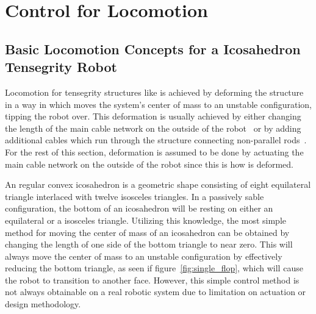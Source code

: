 \chapter{Control for \SB{} Locomotion}
\label{controls}

\section{Basic Locomotion Concepts for a Icosahedron Tensegrity Robot}
\label{basic_locomotion}

Locomotion for tensegrity structures like \SB{} is achieved by deforming the structure in a way in which moves the system's center of mass to an unstable configuration, tipping the robot over.
This deformation is usually achieved by either changing the length of the main cable network on the outside of the robot~\cite{sabelhaus2015system,kim2014rapid} or by adding additional cables which run through the structure connecting non-parallel rods~\cite{caluwaerts2014design}.
For the rest of this section, deformation is assumed to be done by actuating the main cable network on the outside of the robot since this is how \SB{} is deformed.

An regular convex icosahedron is a geometric shape consisting of eight equilateral triangle interlaced with twelve isosceles triangles.
In a passively sable configuration, the bottom of an icosahedron will be resting on either an equilateral or a isosceles triangle.
Utilizing this knowledge, the most simple method for moving the center of mass of an icosahedron can be obtained by changing the length of one side of the bottom triangle to near zero.
This will always move the center of mass to an unstable configuration by effectively reducing the bottom triangle, as seen if figure~\ref{fig:single_flop}, which will cause the robot to transition to another face.
However, this simple control method is not always obtainable on a real robotic system due to limitation on actuation or design methodology.

